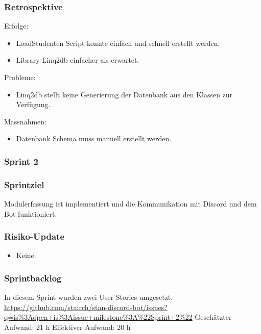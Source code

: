 \documentclass[a4paper, table]{article}
\begin{document}
\subsubsection*{Retrospektive}
Erfolge:
\begin{itemize}
    \item LoadStudenten Script konnte einfach und schnell erstellt werden.
    \item Library Linq2db einfacher als erwartet.
\end{itemize}
Probleme:
\begin{itemize}
    \item Linq2db stellt keine Generierung der Datenbank aus den Klassen zur Verfügung.
\end{itemize}
Massnahmen:
\begin{itemize}
    \item Datenbank Schema muss manuell erstellt werden.
\end{itemize}
\newpage

\subsubsection{Sprint 2}
\subsubsection*{Sprintziel}
Modulerfassung ist implementiert und die Kommunikation mit Discord und dem Bot funktioniert.

\subsubsection*{Risiko-Update}
\begin{itemize}
    \item Keine.
\end{itemize}

\subsubsection*{Sprintbacklog}
In diesem Sprint wurden zwei User-Stories umgesetzt.\\
\url{https://github.com/stairch/stan-discord-bot/issues?q=is%3Aopen+is%3Aissue+milestone%3A%22Sprint+2%22}
\newline
Geschätzter Aufwand: 21 h
\newline
Effektiver Aufwand: 20 h
\end{document}
